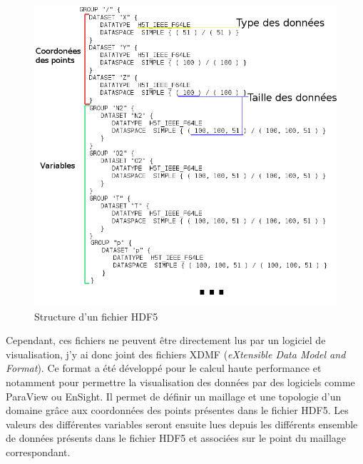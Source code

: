 \begin{figure}[!ht]
  \centering
  \includegraphics[scale=0.5]{figures/hdf5_struct.png}
  \caption{\label{fig:hdf5_struct} Structure d'un fichier HDF5}
\end{figure}

Cependant, ces fichiers ne peuvent être directement lus par un logiciel de visualisation, j'y ai donc joint des fichiers XDMF (\textit{eXtensible Data Model and Format}). Ce format a été développé pour le calcul haute performance et notamment pour permettre la visualisation des données par des logiciels comme ParaView ou EnSight. Il permet de définir un maillage et une topologie d'un domaine grâce aux coordonnées des points présentes dans le fichier HDF5. Les valeurs des différentes variables seront ensuite lues depuis les différents ensemble de données présents dans le fichier HDF5 et associées sur le point du maillage correspondant.



